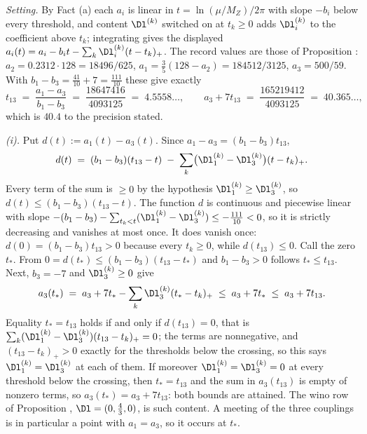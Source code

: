 \emph{Setting.} By Fact (a) each $a_{i}$ is linear in $t = \ln(\mu/M_{Z})/2\pi$ with slope $-b_{i}$ below every threshold, and content $\Dl^{(k)}$ switched on at $t_{k} \ge 0$ adds $\Dl^{(k)}_{i}$ to the coefficient above $t_{k}$; integrating gives the displayed $a_{i}(t) = a_{i} - b_{i}t - \sum_{k}\Dl^{(k)}_{i}(t - t_{k})_{+}$. The record values are those of Proposition : $a_{2} = 0.2312 \cdot 128 = 18496/625$, $a_{1} = \tfrac35(128 - a_{2}) = 184512/3125$, $a_{3} = 500/59$. With $b_{1} - b_{3} = \tfrac{41}{10} + 7 = \tfrac{111}{10}$ these give exactly
\[
t_{13} \;=\; \frac{a_{1} - a_{3}}{b_{1} - b_{3}} \;=\; \frac{18647416}{4093125} \;=\; 4.5558\ldots, \qquad
a_{3} + 7t_{13} \;=\; \frac{165219412}{4093125} \;=\; 40.365\ldots,
\]
which is $40.4$ to the precision stated.

\emph{(i).} Put $d(t) := a_{1}(t) - a_{3}(t)$. Since $a_{1} - a_{3} = (b_{1} - b_{3})t_{13}$,
\[
d(t) \;=\; (b_{1} - b_{3})(t_{13} - t) \;-\; \sum_{k}\bigl(\Dl^{(k)}_{1} - \Dl^{(k)}_{3}\bigr)(t - t_{k})_{+}.
\]
Every term of the sum is $\ge 0$ by the hypothesis $\Dl^{(k)}_{1} \ge \Dl^{(k)}_{3}$, so $d(t) \le (b_{1} - b_{3})(t_{13} - t)$. The function $d$ is continuous and piecewise linear with slope $-(b_{1} - b_{3}) - \sum_{t_{k} < t}(\Dl^{(k)}_{1} - \Dl^{(k)}_{3}) \le -\tfrac{111}{10} < 0$, so it is strictly decreasing and vanishes at most once. It does vanish once: $d(0) = (b_{1} - b_{3})t_{13} > 0$ because every $t_{k} \ge 0$, while $d(t_{13}) \le 0$. Call the zero $t_{*}$. From $0 = d(t_{*}) \le (b_{1} - b_{3})(t_{13} - t_{*})$ and $b_{1} - b_{3} > 0$ follows $t_{*} \le t_{13}$. Next, $b_{3} = -7$ and $\Dl^{(k)}_{3} \ge 0$ give
\[
a_{3}(t_{*}) \;=\; a_{3} + 7t_{*} - \sum_{k}\Dl^{(k)}_{3}(t_{*} - t_{k})_{+} \;\le\; a_{3} + 7t_{*} \;\le\; a_{3} + 7t_{13}.
\]
Equality $t_{*} = t_{13}$ holds if and only if $d(t_{13}) = 0$, that is $\sum_{k}(\Dl^{(k)}_{1} - \Dl^{(k)}_{3})(t_{13} - t_{k})_{+} = 0$; the terms are nonnegative, and $(t_{13} - t_{k})_{+} > 0$ exactly for the thresholds below the crossing, so this says $\Dl^{(k)}_{1} = \Dl^{(k)}_{3}$ at each of them. If moreover $\Dl^{(k)}_{1} = \Dl^{(k)}_{3} = 0$ at every threshold below the crossing, then $t_{*} = t_{13}$ and the sum in $a_{3}(t_{13})$ is empty of nonzero terms, so $a_{3}(t_{*}) = a_{3} + 7t_{13}$: both bounds are attained. The wino row of Proposition , $\Dl = (0, \tfrac43, 0)$, is such content. A meeting of the three couplings is in particular a point with $a_{1} = a_{3}$, so it occurs at $t_{*}$.

